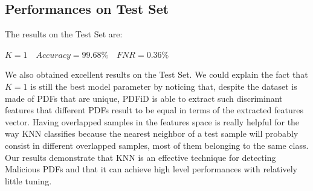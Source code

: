 \documentclass[twocolumn, switch]{article} %
\begin{document}
\subsection{Performances on Test Set}
The results on the Test Set are:
\begin{center}
	$K=1 \quad Accuracy=99.68\% \quad FNR=0.36\%$
\end{center}

We also obtained excellent results on the Test Set. We could explain the fact that $K=1$ is still the best model parameter by noticing that, despite the dataset is made of PDFs that are unique, PDFiD is able to extract such discriminant features that different PDFs result to be equal in terms of the extracted features vector. Having overlapped samples in the features space is really helpful for the way KNN classifies because the nearest neighbor of a test sample will probably consist in different overlapped samples, most of them belonging to the same class.
Our results demonstrate that KNN is an effective technique for detecting Malicious PDFs and that it can achieve high level performances with relatively little tuning.

\end{document}
